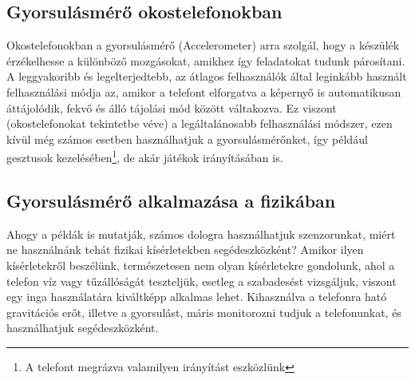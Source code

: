 \documentclass{thesis-ekf}
\theoremstyle{definition}
\theoremstyle{remark}
\begin{document}
\subsection{Gyorsulásmérő okostelefonokban}
Okostelefonokban a gyorsulásmérő (Accelerometer) arra szolgál, hogy a készülék érzékelhesse a különböző mozgásokat, amikhez így feladatokat tudunk párosítani. A leggyakoribb és legelterjedtebb, az átlagos felhasználók által leginkább használt felhasználási módja az, amikor a telefont elforgatva a képernyő is automatikusan áttájolódik, fekvő és álló tájolási mód között váltakozva. Ez viszont (okostelefonokat tekintetbe véve) a legáltalánosabb felhasználási módszer, ezen kívül még számos esetben használhatjuk a gyorsulásmérőnket, így például gesztusok kezelésében\footnote{A telefont megrázva valamilyen irányítást eszközlünk}, de akár játékok irányításában is.
\subsection{Gyorsulásmérő alkalmazása a fizikában}
Ahogy a példák is mutatják, számos dologra használhatjuk szenzorunkat, miért ne használnánk tehát fizikai kísérletekben segédeszközként? Amikor ilyen kísérletekről beszélünk, természetesen nem olyan kísérletekre gondolunk, ahol a telefon víz vagy tűzállóságát teszteljük, esetleg a szabadesést vizsgáljuk, viszont egy inga használatára kiváltképp alkalmas lehet. Kihasználva a telefonra ható gravitációs erőt, illetve a gyorsulást, máris monitorozni tudjuk a telefonunkat, és használhatjuk segédeszközként.
\end{document}
